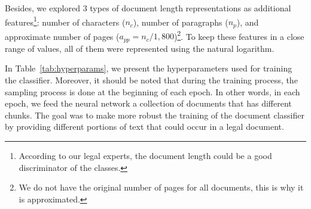 \documentclass[11pt]{article}
\begin{document}
    Besides, we explored 3 types of document length representations as additional features\footnote{According to our legal experts, the document length could be a good discriminator of the classes.}: number of characters ($n_c$), number of paragraphs ($n_p$), %
    and approximate number of pages ($a_{pp} = n_c / 1,800$)\footnote{We do not have the original number of pages for all documents, this is why it is approximated.}. To keep these features in a close range of values, all of them were represented using the natural logarithm.

    In Table~\ref{tab:hyperparams}, we present the hyperparameters used for training the classifier. Moreover, it should be noted that during the training process, the sampling process is done at the beginning of each epoch. In other words, in each epoch, we feed the neural network a collection of documents that has different chunks. The goal was to make more robust the training of the document classifier by providing different portions of text that could occur in a legal document.

    

\begin{table}[t]
	\centering
	\caption{Hyperparameters used for training the models using an NVIDIA - A100 80Gb.}
	\label{tab:hyperparams}
    \vspace{-0.3em}
\end{table} 
\end{document}
